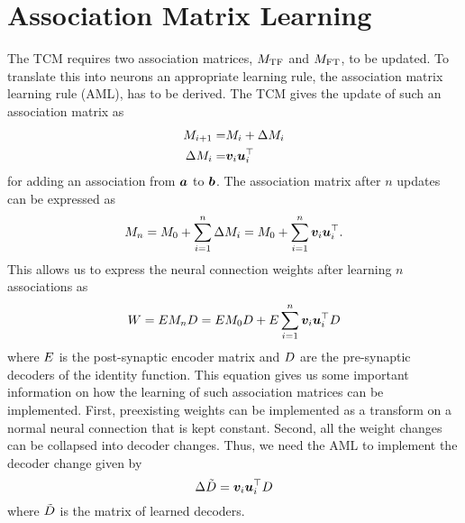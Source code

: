 \chapter{Association Matrix Learning}

The TCM requires two association matrices, $M_{\mathrm{TF}}$ and $M_{\mathrm{FT}}$, to be updated.
To translate this into neurons an appropriate learning rule, the association matrix learning rule (AML), has to be derived.
The TCM gives the update of such an association matrix as
\begin{eqnarray}
    M_{i+1} =& M_i + \Delta M_i \\
    \Delta M_i =& \bm{v}_i \bm{u}_i^{\top}
\end{eqnarray}
for adding an association from $\bm{a}$ to $\bm{b}$.
The association matrix after $n$ updates can be expressed as
\begin{equation}
    M_n = M_0 + \sum_{i=1}^{n} \Delta M_i = M_0 + \sum_{i=1}^n \bm{v}_i \bm{u}_i^{\top} \text{.}
\end{equation}
This allows us to express the neural connection weights after learning $n$ associations as
\begin{equation}
    W = E M_n D = E M_0 D + E \sum_{i=1}^n \bm{v}_i \bm{u}_i^{\top} D
\end{equation}
where $E$ is the post-synaptic encoder matrix and $D$ are the pre-synaptic decoders of the identity function.
This equation gives us some important information on how the learning of such association matrices can be implemented.
First, preexisting weights can be implemented as a transform on a normal neural connection that is kept constant.
Second, all the weight changes can be collapsed into decoder changes.
Thus, we need the AML to implement the decoder change given by
\begin{equation}
    \Delta \tilde{D} = \bm{v}_i \bm{u}_i^{\top} D
\end{equation}
where $\tilde{D}$ is the matrix of learned decoders.

